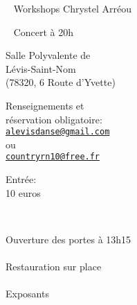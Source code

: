 \documentclass[12pt,a4paper]{article}
\begin{document}
\vspace*{-20mm}


\begin{flushleft}

\fontsize{54pt}{54pt}
\selectfont
~ Workshops Chrystel Arréou

~ Concert à 20h %
\end{flushleft}




\vspace*{15mm}

\fontsize{20pt}{20pt}\selectfont

Salle Polyvalente de \\
Lévis-Saint-Nom\\
{\fontsize{14pt}{16pt}\selectfont
(78320, 6 Route d'Yvette)}

\vspace*{5mm}

Renseignements et \\
réservation obligatoire: \\
\href{mailto:alevisdanse@gmail.com?subject=Bal 13 decembre}{\texttt{\color{blue!50!black}alevisdanse@gmail.com}} \\
ou\\
\href{mailto:countryrn10@free.fr?subject=Bal 13 decembre}{\texttt{\color{blue!50!black}countryrn10@free.fr}}

\vspace*{5mm}

Entrée: \\
10 euros

\vspace*{-30mm}
\vfill

~\hfill\begin{minipage}{0.35\linewidth}
  \begin{center}
    Ouverture des portes
    à 13h15\\
    ~\\
    Restauration
    sur place\\
    ~\\
    Exposants
\end{center}
\end{minipage}

\end{document}
